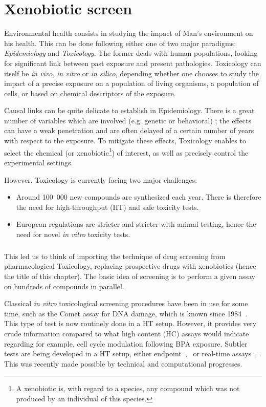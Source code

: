
\chapter{Xenobiotic screen}

Environmental health consists in studying the impact of Man's environment on his health. This can be done following either one of two major paradigms: \textit{Epidemiology} and \textit{Toxicology}. The former deals with human populations, looking for significant link between past exposure and present pathologies. Toxicology can itself be \textit{in vivo}, \textit{in vitro} or \textit{in silico}, depending whether one chooses to study the impact of a precise exposure on a population of living organisms, a population of cells, or based on chemical descriptors of the exposure.

Causal links can be quite delicate to establish in Epidemiology. There is a great number of variables which are involved (e.g. genetic or behavioral) ; the effects can have a weak penetration and are often delayed of a certain number of years with respect to the exposure. To mitigate these effects, Toxicology enables to select the chemical (or xenobiotic\footnote{A xenobiotic is, with regard to a species, any compound which was not produced by an individual of this species.}) of interest, as well as precisely control the experimental settings.

However, Toxicology is currently facing two major challenges:
\begin{itemize}
\item Around 100~000 new compounds are synthesized each year. There is therefore the need for high-throughput (HT) and safe toxicity tests.
\item European regulations are stricter and stricter with animal testing, hence the need for novel \textit{in vitro} toxicity tests.
\end{itemize}
\paragraph*{}	
This led us to think of importing the technique of drug screening from pharmacological Toxicology, replacing prospective drugs with xenobiotics (hence the title of this chapter). The basic idea of screening is to perform a given assay on hundreds of compounds in parallel.

Classical \textit{in vitro} toxicological screening procedures have been in use for some time, such as the Comet assay for DNA damage, which is known since 1984~\cite{pmid6477583}. This type of test is now routinely done in a HT setup. However, it provides very crude information compared to what high content (HC) assays would indicate regarding for example, cell cycle modulation following BPA exposure. Subtler tests are being developed in a HT setup, either endpoint~\cite{pmid24772387},~\cite{pmid24610750} or real-time assays~\cite{pmid21516415}, \cite{pmid24141454}. This was recently made possible  by technical and computational progresses.

